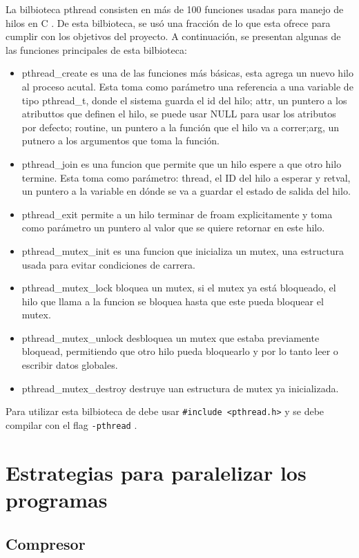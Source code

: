 \documentclass{report}
\begin{document}
La bilbioteca pthread consisten en más de 100 funciones usadas para manejo de hilos en C \cite{ref6}. 
De esta bilbioteca, se usó una fracción de lo que esta ofrece para cumplir con los objetivos del proyecto.
A continuación, se presentan algunas de las funciones principales de esta bilbioteca:
\begin{itemize}
    \item pthread\_create es una de las funciones más básicas, esta agrega un nuevo hilo al proceso acutal. Esta toma como parámetro una referencia a una variable de tipo pthread\_t, donde el sistema guarda el id del hilo; attr, un puntero a los atributtos que definen el hilo, se puede usar NULL para usar los atributos por defecto; routine, un puntero a la función que el hilo va a correr;arg, un putnero a los argumentos que toma la función.
    \item pthread\_join es una funcion que permite que un hilo espere a que otro hilo termine. Esta toma como parámetro: thread, el ID del hilo a esperar y retval, un puntero a la variable en dónde se va a guardar el estado de salida del hilo.
    \item pthread\_exit permite a un hilo terminar de froam explicitamente y toma como parámetro un puntero al valor que se quiere retornar en este hilo.
    \item pthread\_mutex\_init es una funcion que inicializa un mutex, una estructura usada para evitar condiciones de carrera.
    \item pthread\_mutex\_lock bloquea un mutex, si el mutex ya está bloqueado, el hilo que llama a la funcion se bloquea hasta que este pueda bloquear el mutex.
    \item pthread\_mutex\_unlock desbloquea un mutex que estaba previamente bloquead, permitiendo que otro hilo pueda bloquearlo y por lo tanto leer o escribir datos globales.
    \item pthread\_mutex\_destroy destruye uan estructura de mutex ya inicializada.
\end{itemize}
Para utilizar esta bilbioteca de debe usar \texttt{\#include <pthread.h>} y se debe compilar con el flag \texttt{-pthread} \cite{ref6}.

\section {Estrategias para paralelizar los programas}

\subsection {Compresor}
\end{document}
